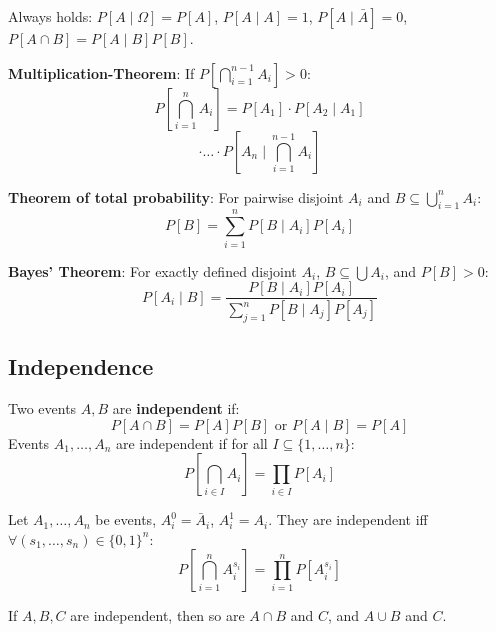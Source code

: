 \begin{remark}
Always holds: $P[A \mid \Omega] = P[A]$, $P[A \mid A] = 1$, $P[A \mid \bar{A}] = 0$, $P[A \cap B] = P[A \mid B] P[B]$.
\end{remark}

\begin{theorem}
\textbf{Multiplication-Theorem}: If $P[\bigcap_{i=1}^{n-1} A_i] > 0$:
$$P[\bigcap_{i=1}^n A_i] = P[A_1] \cdot P[A_2 \mid A_1]$$
$$\cdot \dots \cdot P[A_n \mid \bigcap_{i=1}^{n-1} A_i]$$
\end{theorem}

\begin{theorem}
\textbf{Theorem of total probability}: For pairwise disjoint $A_i$ and $B \subseteq \bigcup_{i=1}^n A_i$:
$$P[B] = \sum_{i=1}^n P[B \mid A_i] P[A_i]$$
\end{theorem}

\begin{theorem}
\textbf{Bayes' Theorem}: For exactly defined disjoint $A_i$, $B \subseteq \bigcup A_i$, and $P[B] > 0$:
$$P[A_i \mid B] = \frac{P[B \mid A_i] P[A_i]}{\sum_{j=1}^n P[B \mid A_j] P[A_j]}$$
\end{theorem}

\subsection{Independence}

\begin{definition}
Two events $A, B$ are \textbf{independent} if:
$$P[A \cap B] = P[A] P[B] \text{ or } P[A \mid B] = P[A]$$
Events $A_1, \dots, A_n$ are independent if for all $I \subseteq \{1, \dots, n\}$:
$$P[\bigcap_{i \in I} A_i] = \prod_{i \in I} P[A_i]$$
\end{definition}

\begin{lemma}
Let $A_1, \dots, A_n$ be events, $A_i^0 = \bar{A}_i$, $A_i^1 = A_i$. They are independent iff $\forall (s_1,\dots,s_n) \in \{0,1\}^n$:
$$P[\bigcap_{i=1}^n A_i^{s_i}] = \prod_{i=1}^n P[A_i^{s_i}]$$
\end{lemma}

\begin{lemma}
If $A, B, C$ are independent, then so are $A \cap B$ and $C$, and $A \cup B$ and $C$.
\end{lemma}

